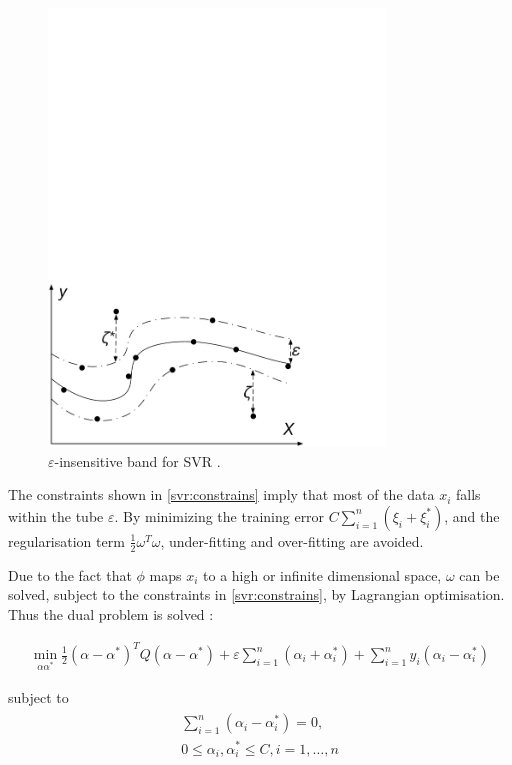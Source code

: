 \begin{figure}[b]
	\includegraphics[width=0.8\textwidth]{Chapter5/figures/short-term-forecasting/Kell_eEnergy_Fig2.pdf}
	\caption{$\varepsilon$-insensitive band for SVR \cite{Shu2006}.}
	\label{fig:insensitive}
\end{figure}

The constraints shown in \eqref{svr:constrains} imply that most of the data $x_i$ falls within the tube $\varepsilon$. By minimizing the training error $C\sum_{i=1}^n(\xi_i+\xi_i^*)$, and the regularisation term $\frac{1}{2}\omega^T\omega$, under-fitting and over-fitting are avoided. 

Due to the fact that $\phi$ maps $x_i$ to a high or infinite dimensional space, $\omega$ can be solved, subject to the constraints in \eqref{svr:constrains}, by Lagrangian optimisation. Thus the dual problem is solved \cite{Shu2006,Chen2004,Smola2004}:

\begin{align}
\min_{\alpha\alpha^*}\frac{1}{2}(\alpha-\alpha^*)^TQ(\alpha-\alpha^*)+\varepsilon\sum^n_{i=1}(\alpha_i+\alpha_i^*)+\sum_{i=1}^ny_i(\alpha_i-\alpha_i^*)
\end{align}

\noindent subject to 
\begin{align}
\begin{multlined}
\sum_{i=1}^n(\alpha_i-\alpha_i^*)=0,\\
0\leq\alpha_i,\alpha^*_i\leq C,i=1,\ldots,n
\end{multlined}
\end{align}


